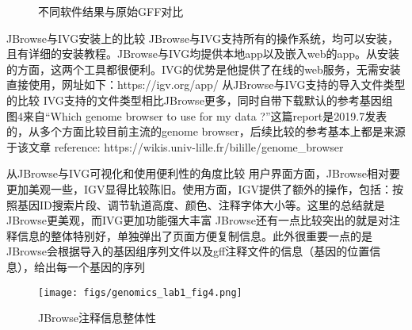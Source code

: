 \documentclass[12pt]{ctexart}
\begin{document}
\begin{figure}[htbp]
\centering
{}
\quad
{}
\quad
{}
\quad
{}
\caption{不同软件结果与原始GFF对比}
\end{figure}

\begin{outline}[enumerate]
\1 JBrowse与IVG安装上的比较
\2 JBrowse与IVG支持所有的操作系统，均可以安装，且有详细的安装教程。JBrowse与IVG均提供本地app以及嵌入web的app。从安装的方面，这两个工具都很便利。IVG的优势是他提供了在线的web服务，无需安装直接使用，网址如下：https://igv.org/app/
\1 从JBrowse与IVG支持的导入文件类型的比较
\2 IVG支持的文件类型相比JBrowse更多，同时自带下载默认的参考基因组
\2 图4来自“Which genome browser to use for my data ?”这篇report是2019.7发表的，从多个方面比较目前主流的genome browser，后续比较的参考基本上都是来源于该文章
\2 reference: https://wikis.univ-lille.fr/bilille/genome_browser

\1 从JBrowse与IVG可视化和使用便利性的角度比较
\2 用户界面方面，JBrowse相对要更加美观一些，IGV显得比较陈旧。使用方面，IGV提供了额外的操作，包括：按照基因ID搜索片段、调节轨道高度、颜色、注释字体大小等。这里的总结就是JBrowse更美观，而IVG更加功能强大丰富
\1 JBrowse还有一点比较突出的就是对注释信息的整体特别好，单独弹出了页面方便复制信息。此外很重要一点的是JBrowse会根据导入的基因组序列文件以及gff注释文件的信息（基因的位置信息），给出每一个基因的序列
\end{outline}

\begin{figure}[h!]
\centering
\texttt{[image: figs/genomics\_lab1\_fig4.png]}
\caption{JBrowse注释信息整体性}
\end{figure}

\newpage



\end{document}
